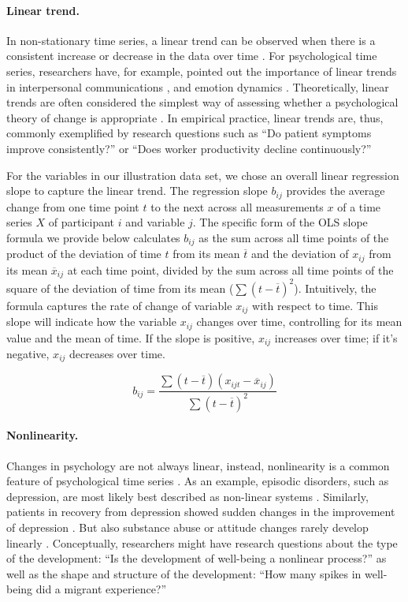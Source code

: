 \documentclass[man, 12pt, a4paper, floatsintext]{apa7}
\theoremstyle{break}
\theoremstyle{plain}
\begin{document}
\paragraph{Linear trend.}

In non-stationary time series, a linear trend can be observed when there
is a consistent increase or decrease in the data over time
\citep{nyblom1986}. For psychological time series, researchers have, for
example, pointed out the importance of linear trends in interpersonal
communications \citep{vasileiadou2014}, and emotion dynamics
\citep{oravecz2016}. Theoretically, linear trends are often considered
the simplest way of assessing whether a psychological theory of change
is appropriate \citep{gottman1969}. In empirical practice, linear trends
are, thus, commonly exemplified by research questions such as ``Do
patient symptoms improve consistently?'' or ``Does worker productivity
decline continuously?''

For the variables in our illustration data set, we chose an overall
linear regression slope to capture the linear trend. The regression
slope \(b_{ij}\) provides the average change from one time point \(t\)
to the next across all measurements \(x\) of a time series \(X\) of
participant \(i\) and variable \(j\). The specific form of the OLS slope
formula we provide below calculates \(b_{ij}\) as the sum across all
time points of the product of the deviation of time \(t\) from its mean
\(\overline{t}\) and the deviation of \(x_{ij}\) from its mean
\(\overline{x}_{ij}\) at each time point, divided by the sum across all
time points of the square of the deviation of time from its mean
(\(\sum(t-\overline{t})^2\)). Intuitively, the formula captures the rate
of change of variable \(x_{ij}\) with respect to time. This slope will
indicate how the variable \(x_{ij}\) changes over time, controlling for
its mean value and the mean of time. If the slope is positive,
\(x_{ij}\) increases over time; if it's negative, \(x_{ij}\) decreases
over time.

\begin{equation} \label{eq:lin}
  b_{ij} = \frac{\sum(t-\overline{t})(x_{ijt}-\overline{x}_{ij})}{\sum(t-\overline{t})^2}
\end{equation}

\paragraph{Nonlinearity.}

Changes in psychology are not always linear, instead, nonlinearity is a
common feature of psychological time series \citep{hayes2007}. As an
example, episodic disorders, such as depression, are most likely best
described as non-linear systems \citep{hosenfeld2015}. Similarly,
patients in recovery from depression showed sudden changes in the
improvement of depression \citep{helmich2020a}. But also substance abuse
\citep{boker1998} or attitude changes rarely develop linearly
\citep{vandermaas2003}. Conceptually, researchers might have research
questions about the type of the development: ``Is the development of
well-being a nonlinear process?'' as well as the shape and structure of
the development: ``How many spikes in well-being did a migrant
experience?''
\end{document}
